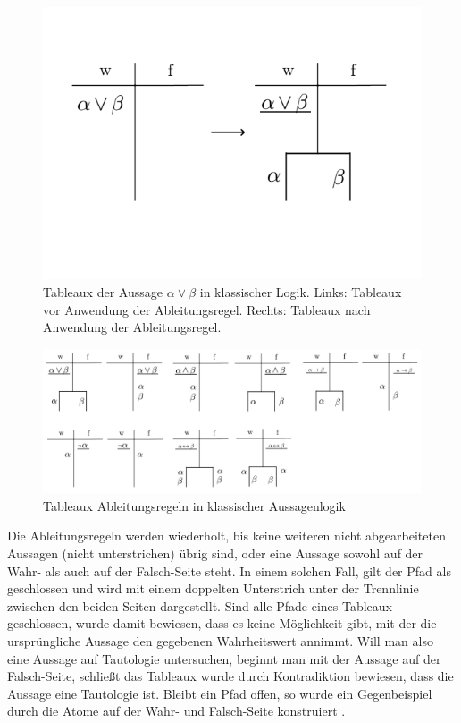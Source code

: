 \begin{figure}
\begin{center}
\includegraphics[scale=0.7]{images/Tableaux_Or_Prop_Logic.png}
\caption{Tableaux der Aussage $\alpha\vee\beta$ in klassischer Logik. Links: Tableaux vor Anwendung der Ableitungsregel. Rechts: Tableaux nach Anwendung der Ableitungsregel.}
\label{tableaux_prop_or}
\end{center}
\end{figure}

\begin{figure}
\begin{center}
\includegraphics[scale=0.5]{images/Tableaux_Rules_Prop_Logic.png}
\caption{Tableaux Ableitungsregeln in klassischer Aussagenlogik}
\label{tableaux_class_prop_all_rules}
\end{center}
\end{figure}

Die Ableitungsregeln werden wiederholt, bis keine weiteren nicht abgearbeiteten Aussagen (nicht unterstrichen) übrig sind, oder eine Aussage sowohl auf der Wahr- als auch auf der Falsch-Seite steht. In einem solchen Fall, gilt der Pfad als geschlossen und wird mit einem doppelten Unterstrich unter der Trennlinie zwischen den beiden Seiten dargestellt. Sind alle Pfade eines Tableaux geschlossen, wurde damit bewiesen, dass es keine Möglichkeit gibt, mit der die ursprüngliche Aussage den gegebenen Wahrheitswert annimmt. Will man also eine Aussage auf Tautologie untersuchen, beginnt man mit der Aussage auf der Falsch-Seite, schließt das Tableaux wurde durch Kontradiktion bewiesen, dass die Aussage eine Tautologie ist. Bleibt ein Pfad offen, so wurde ein Gegenbeispiel durch die Atome auf der Wahr- und Falsch-Seite konstruiert \cite{KB14}.

